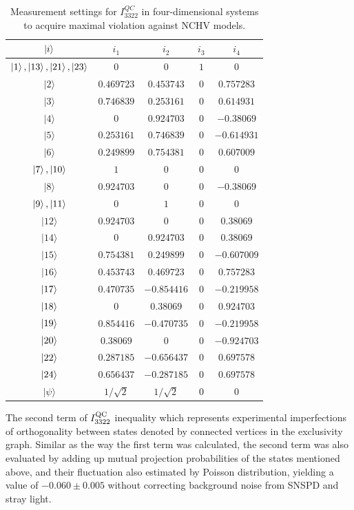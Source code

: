 \documentclass[pra,letterpaper,english,preprint,nofootinbib,aps,superscriptaddress,showkeys]{revtex4-1}
\theoremstyle{definition}
\theoremstyle{remark}
\begin{document}
\begin{table}[htbp]
    \centering
    \begin{tabular}{|c|cccc|} \hline \hline
$\ket{i}$ & $i_1$ & $i_2$ & $i_3$ & $i_4$  \\
\hline
$\ket{1}, \ket{13}, \ket{21}, \ket{23}$ & $0$ & $0$ & $1$ & $0$  \\
$|2\rangle$  & $0.469723$ & $0.453743$ & $0$ & $0.757283$  \\
$|3\rangle$ & $0.746839$ & $0.253161$ & $0$ & $0.614931$  \\
$|4\rangle$  & $0$ & $0.924703$ & $0$ & $-0.38069$  \\
$|5\rangle$ & $0.253161$ & $0.746839$ & $0$ & $-0.614931$  \\
$|6\rangle$ & $0.249899$ & $0.754381$ & $0$ & $0.607009$  \\
$\ket{7}, \ket{10}$ & $1$ & $0$ & $0$ & $0$  \\
$|8\rangle$  & $0.924703$ & $0$ & $0$ & $-0.38069$  \\
$\ket{9}, \ket{11}$  & $0$ & $1$ & $0$ & $0$  \\
$|12\rangle$  & $0.924703$ & $0$ & $0$ & $0.38069$  \\
$|14\rangle$  & $0$ & $0.924703$ & $0$ & $0.38069$  \\
$|15\rangle$ & $0.754381$ & $0.249899$ & $0$ & $-0.607009$  \\
$|16\rangle$  & $0.453743$ & $0.469723$ & $0$ & $0.757283$  \\
$\ket{17}$ & $0.470735$ & $-0.854416$ & $0$ & $-0.219958$ \\
$\ket{18}$ & $0$ & $0.38069$ & $0$ & $0.924703$ \\
$\ket{19}$ & $0.854416$ & $-0.470735$ & $0$ & $-0.219958$ \\
$\ket{20}$ & $0.38069$ & $0$ & $0$ & $-0.924703$ \\
$\ket{22}$ & $0.287185$ & $-0.656437$ & $0$ & $0.697578$ \\
$\ket{24}$ & $0.656437$ & $-0.287185$ & $0$ & $0.697578$ \\
\hline
$|\psi\rangle$ & $1/\sqrt{2}$ & $1/\sqrt{2}$ & $0$ & $0$ \\
  \hline \hline
   \end{tabular}
    \caption{Measurement settings for $I_{3322}^{QC}$ in four-dimensional systems to acquire maximal violation against NCHV models.}
    \label{tab:set19}
 \end{table}

\fi

 The second term of $I_{3322}^{\rm QC}$ inequality which represents experimental imperfections of orthogonality between states denoted by connected vertices in the exclusivity graph.
 Similar as the way the first term was calculated, the second term was also evaluated by adding up mutual projection probabilities of the states mentioned above, and their fluctuation also estimated by Poisson distribution, yielding a value of $-0.060 \pm 0.005$ without correcting background noise from SNSPD and stray light.
\end{document}
